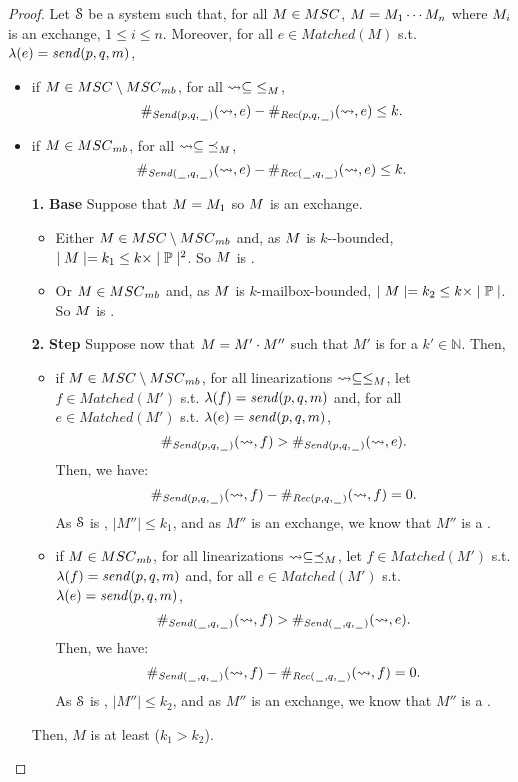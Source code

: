 \begin{proof}

	Let $\System$ be a system such that, for all $\msc \in \MSCs$, $\msc = \msc_1 \cdots \msc_n$ where $\msc_i$ is an exchange, $1\leq i \leq n$.
	Moreover, for all $e \in Matched(M)$ s.t. $\lambda(e) = \send{p}{q}{\msg}$,
	\begin{itemize}
		\item if $\msc \in \MSCs \setminus \mbMSCs$, for all $\lin \subseteq {\le}_\msc$, 	\[\sametype{e}{\pqsAct{p}{q}}{\linrel} - \sametype{e}{\pqrAct{p}{q}}{\linrel} \le k.\]
		\item if $\msc \in \mbMSCs$, for all $\lin \subseteq {\preceq}_\msc$,
		\[\sametype{e}{\pqsAct{\plh}{q}}{\linrel} - \sametype{e}{\pqrAct{\plh}{q}}{\linrel} \le k.\]
	\end{itemize}
	\begin{itemize}
		\item[\textbf{1.}]\textbf{Base}
		Suppose that $\msc = \msc_1$ so $\msc$ is an exchange.
		\begin{itemize}
			\item Either $\msc \in \MSCs \setminus \mbMSCs$ and, as $\msc $ is $k$-\pp-bounded, $\mid \msc \mid = k_1 \leq k \times \mid \procSet \mid^2 $.
			So $\msc$ is .
			\item Or $\msc \in \mbMSCs$ and,   as $\msc$ is $k$-mailbox-bounded,
			$\mid \msc \mid = k_2 \leq k \times \mid \procSet \mid $. 			So $\msc$ is .
		\end{itemize}
		\item[\textbf{2.}]\textbf{Step}
		Suppose now that $\msc = M' \cdot  M''$ such that $M'$ is  for a $k' \in \mathbb{N}$.  Then,
\begin{itemize}
	\item  if $\msc \in \MSCs \setminus \mbMSCs$,	for all linearizations $\lin \subseteq  \le_\msc$, let $f \in Matched(M')$ s.t. $\lambda(f) = \send{p}{q}{\msg}$ and, for all $e \in Matched(M')$ s.t. $\lambda(e) = \sact{p}{q}{\msg}$,
	\[\sametype{f}{\pqsAct{p}{q}}{\linrel} > \sametype{e}{\pqsAct{p}{q}}{\linrel}.\]
	Then, we have:
	\[\sametype{f}{\pqsAct{p}{q}}{\linrel} - \sametype{f}{\pqrAct{p}{q}}{\linrel} = 0.\]
	As $\System$ is , $\mid M'' \mid \leq k_1$, and as $M''$ is an exchange, we know that $M''$ is a .
	\item  if $\msc \in \mbMSCs$,	for all linearizations $\lin \subseteq  \preceq_\msc$, let $f \in Matched(M')$ s.t. $\lambda(f) = \send{p}{q}{\msg}$ and, for all $e \in Matched(M')$ s.t. $\lambda(e) = \sact{p}{q}{\msg}$,
	\[\sametype{f}{\pqsAct{\plh}{q}}{\linrel} > \sametype{e}{\pqsAct{\plh}{q}}{\linrel}.\]
	Then, we have:
	\[\sametype{f}{\pqsAct{\plh}{q}}{\linrel} - \sametype{f}{\pqrAct{\plh}{q}}{\linrel} = 0.\]
	As $\System$ is , $\mid M'' \mid \leq k_2$, and as $M''$ is an exchange, we know that $M''$ is a .
\end{itemize}
Then, $M$ is at least  ($k_1 > k_2$).


\end{itemize}
\end{proof}
